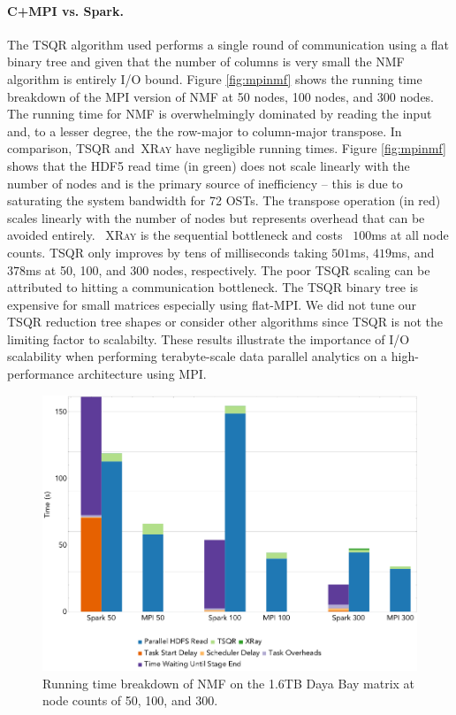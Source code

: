\paragraph{C+MPI vs. Spark.}
The TSQR algorithm used performs a single round of communication using a flat binary tree and given that the number of columns is very small the NMF algorithm is entirely I/O bound. Figure \ref{fig:mpinmf} shows the running time breakdown of the MPI version of NMF at 50 nodes, 100 nodes, and 300 nodes. The running time for NMF is overwhelmingly dominated by reading the input and, to a lesser degree, the the row-major to column-major transpose. In comparison, TSQR and~\textsc{XRay} have negligible running times. Figure \ref{fig:mpinmf} shows that the HDF5 read time (in green) does not scale linearly with the number of nodes and is the primary source of inefficiency -- this is due to saturating the system bandwidth for 72 OSTs. The transpose operation (in red) scales linearly with the number of nodes but represents overhead that can be avoided entirely. ~\textsc{XRay} is the sequential bottleneck and costs ~$100$ms at all node counts. TSQR only improves by tens of milliseconds taking $501$ms, $419$ms, and $378$ms at 50, 100, and 300 nodes, respectively. The poor TSQR scaling can be attributed to hitting a communication bottleneck. The TSQR  binary tree is expensive for small matrices especially using flat-MPI. We did not tune our TSQR reduction tree shapes or consider other algorithms since TSQR is not the limiting factor to scalabilty. These results illustrate the importance of I/O scalability when performing terabyte-scale data parallel analytics on a high-performance architecture using MPI.

\begin{figure}[th!]
\begin{center}
\includegraphics[width=\textwidth]{fig/nmf_run_times.png}
\caption{Running time breakdown of NMF on the 1.6TB Daya Bay matrix at 
node counts of 50, 100, and 300.}
\label{fig:nmfrt}
\end{center}
\end{figure}

